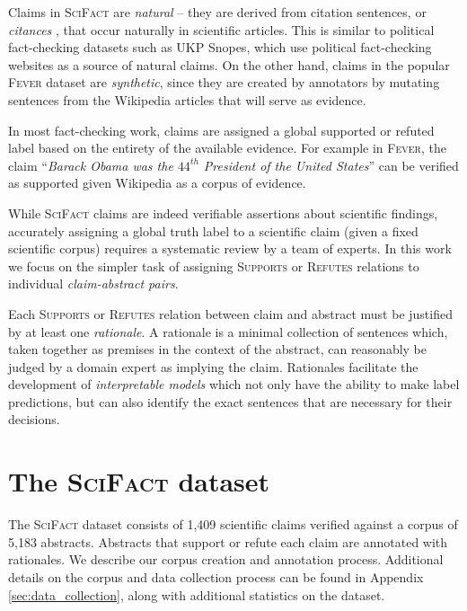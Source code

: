 \documentclass[11pt,a4paper]{article}
\newcommand{\ours}{\textsc{SciFact}\xspace}
\newcommand{\fever}{\textsc{Fever}\xspace}
\newcommand{\snopes}{UKP Snopes\xspace}
\newcommand{\supports}{\textsc{Supports}\xspace}
\newcommand{\refutes}{\textsc{Refutes}\xspace}
\newcommand{\numclaims}{1,409\xspace}
\newcommand{\numpapers}{5,183\xspace}
\begin{document}
Claims in \ours  are \emph{natural} -- they are derived from citation sentences, or \emph{citances} \cite{Nakov2004CitancesC}, that occur naturally in scientific articles. This is similar to political fact-checking datasets such as \snopes \cite{Hanselowski2019ARA}, which use political fact-checking websites as a source of natural claims. On the other hand, claims in the popular \fever dataset \cite{Thorne2018FEVERAL} are \emph{synthetic}, since they are created by annotators by mutating sentences from the Wikipedia articles that will serve as evidence.

\vspace{.2cm}
 \label{sec:evidence}
In most fact-checking work, claims are assigned a global supported or refuted label based on the entirety of the available evidence. For example in \fever, the claim ``\emph{Barack Obama was the $44^{th}$ President of the United States}'' can be verified as supported given Wikipedia as a corpus of evidence.

While \ours claims are indeed verifiable assertions about scientific findings, accurately assigning a global truth label to a scientific claim (given a fixed scientific corpus) requires a systematic review by a team of experts. In this work we focus on the simpler task of assigning \supports or \refutes relations to individual \emph{claim-abstract pairs}.

Each \supports or \refutes relation between claim and abstract must be justified by at least one \emph{rationale}. A rationale is a minimal collection of sentences which, taken together as premises in the context of the abstract, can reasonably be judged by a domain expert as implying the claim. Rationales facilitate the development of \emph{interpretable models} which not only have the ability to make label predictions, but can also identify the exact sentences that are necessary for their decisions.






%
 \section{The \ours dataset} \label{sec:dataset}


\label{sec:dataset_overview}

The \ours dataset consists of \numclaims scientific claims verified against a corpus of \numpapers abstracts.  Abstracts that support or refute each claim are annotated with rationales.  We describe our corpus creation and annotation process. Additional details on the corpus and data collection process can be found in Appendix \ref{sec:data_collection}, along with additional statistics on the dataset.
\end{document}
